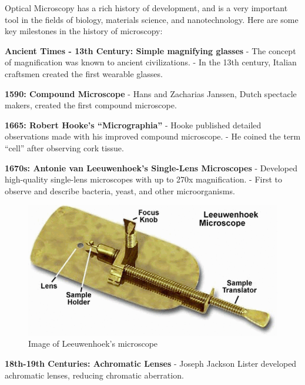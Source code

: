 \documentclass[
  a4paper,
]{book}
\begin{document}
\begin{tcolorbox}[enhanced jigsaw, coltitle=black, title=\textcolor{quarto-callout-note-color}{\faInfo}\hspace{0.5em}{Historical Context of Microscope Development}, colframe=quarto-callout-note-color-frame, toprule=.15mm, opacitybacktitle=0.6, left=2mm, opacityback=0, breakable, toptitle=1mm, bottomtitle=1mm, leftrule=.75mm, arc=.35mm, titlerule=0mm, colbacktitle=quarto-callout-note-color!10!white, rightrule=.15mm, bottomrule=.15mm, colback=white]

Optical Microscopy has a rich history of development, and is a very
important tool in the fields of biology, materials science, and
nanotechnology. Here are some key milestones in the history of
microscopy:

\textbf{Ancient Times - 13th Century: Simple magnifying glasses} - The
concept of magnification was known to ancient civilizations. - In the
13th century, Italian craftsmen created the first wearable glasses.

\textbf{1590: Compound Microscope} - Hans and Zacharias Janssen, Dutch
spectacle makers, created the first compound microscope.

\textbf{1665: Robert Hooke's ``Micrographia''} - Hooke published
detailed observations made with his improved compound microscope. - He
coined the term ``cell'' after observing cork tissue.

\textbf{1670s: Antonie van Leeuwenhoek's Single-Lens Microscopes} -
Developed high-quality single-lens microscopes with up to 270x
magnification. - First to observe and describe bacteria, yeast, and
other microorganisms.

\begin{figure}[H]

{\centering \includegraphics[width=0.5\linewidth,height=\textheight,keepaspectratio]{geometrical-optics/img/loewenhook.png}

}

\caption{Image of Leeuwenhoek's microscope}

\end{figure}%

\textbf{18th-19th Centuries: Achromatic Lenses} - Joseph Jackson Lister
developed achromatic lenses, reducing chromatic aberration.


\end{tcolorbox}
\end{document}
